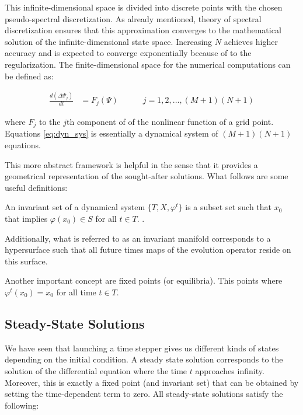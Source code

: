 This infinite-dimensional space is divided into discrete points with the chosen
pseudo-spectral discretization. As already mentioned, theory of spectral
discretization ensures that this approximation converges to the mathematical
solution of the infinite-dimensional state space. Increasing $N$ achieves
higher accuracy and is expected to converge exponentially because of to the
regularization. The finite-dimensional space for the numerical computations can
be defined as:

\begin{align}
  \frac{d(\Delta \Psi_j)}{dt} &= {F_j(\Psi)} \quad \quad \quad
    j= 1,2, ...,(M+1)(N+1) \label{eq:dyn_sys}
\end{align}

where $F_j$ to the $j$th component of of the nonlinear function of a grid point.
Equations \eqref{eq:dyn_sys} is essentially a dynamical system of $(M+1)(N+1)$
equations.

This more abstract framework is helpful in the sense that it provides a
geometrical representation of the sought-after solutions. 
What follows are some useful definitions:

\begin{definition}
An invariant set of a dynamical system $\{T, X, \varphi^t\}$ is a subset set such
that $x_0$ that implies $\varphi(x_0) \in S$ for all $t \in T$. \citep{kuznetsov2004}. 
\end{definition}

Additionally, what is referred to as an invariant manifold corresponds to a
hypersurface such that all future times maps of the evolution operator reside
on this surface.

Another important concept are fixed points (or equilibria). This points where
$\varphi^t(x_0) = x_0$ for all time $t \in T$. 



\subsection{Steady-State Solutions}

We have seen that launching a time stepper gives us different kinds of states
depending on the initial condition. A steady state solution corresponds to the
solution of the differential equation where the time $t$ approaches infinity.
Moreover, this is exactly a fixed point (and invariant set) that can be
obtained by setting the time-dependent term to zero. All steady-state solutions
satisfy the following:

